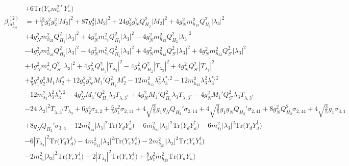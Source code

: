 {\begin{align}
 &+6 \mbox{Tr}\Big({Y_u  m_u^{2 *}  Y_{u}^{\dagger}}\Big) \\ 
\beta_{m_{h_{23}}^2}^{(2)} & =  
+\frac{18}{5} g_{1}^{2} g_{2}^{2} |M_2|^2 +87 g_{2}^{4} |M_2|^2 +24 g_{2}^{2} g_{N}^{2} Q_{H_2}^{2} |M_2|^2 +4 g_{N}^{2} m_{h_{13}}^2 Q_{H_1}^{2} |\lambda_3|^2 \nonumber \\ 
 &+4 g_{N}^{2} m_{h_{23}}^2 Q_{H_1}^{2} |\lambda_3|^2 +4 g_{N}^{2} m_{s_3}^2 Q_{H_1}^{2} |\lambda_3|^2 -4 g_{N}^{2} m_{h_{13}}^2 Q_{H_2}^{2} |\lambda_3|^2 \nonumber \\ 
 &-4 g_{N}^{2} m_{h_{23}}^2 Q_{H_2}^{2} |\lambda_3|^2 -4 g_{N}^{2} m_{s_3}^2 Q_{H_2}^{2} |\lambda_3|^2 +4 g_{N}^{2} m_{h_{13}}^2 Q_{S'}^{2} |\lambda_3|^2 +4 g_{N}^{2} m_{h_{23}}^2 Q_{S'}^{2} |\lambda_3|^2 \nonumber \\ 
 &+4 g_{N}^{2} m_{s_3}^2 Q_{S'}^{2} |\lambda_3|^2 +4 g_{N}^{2} Q_{H_1}^{2} |T_{\lambda_3}|^2 -4 g_{N}^{2} Q_{H_2}^{2} |T_{\lambda_3}|^2 +4 g_{N}^{2} Q_{S'}^{2} |T_{\lambda_3}|^2 \nonumber \\ 
 &+\frac{9}{5} g_{1}^{2} g_{2}^{2} M_1 M_2^* +12 g_{2}^{2} g_{N}^{2} M_1' Q_{H_2}^{2} M_2^* -12 m_{h_{13}}^2 \lambda_{3}^{2} \lambda_{3}^{*,2} -12 m_{h_{23}}^2 \lambda_{3}^{2} \lambda_{3}^{*,2} \nonumber \\ 
 &-12 m_{s_3}^2 \lambda_{3}^{2} \lambda_{3}^{*,2} -4 g_{N}^{2} M_1' Q_{H_1}^{2} \lambda_3 T_{{\lambda,3}^*} +4 g_{N}^{2} M_1' Q_{H_2}^{2} \lambda_3 T_{{\lambda,3}^*} -4 g_{N}^{2} M_1' Q_{S'}^{2} \lambda_3 T_{{\lambda,3}^*} \nonumber \\ 
 &-24 |\lambda_3|^2 T_{{\lambda,3}^*} T_{\lambda_3} +6 g_{2}^{4} \sigma_{2,2} +\frac{6}{5} g_{1}^{2} \sigma_{2,11} +4 \sqrt{\frac{3}{5}} g_1 g_N Q_{H_2}' \sigma_{2,14} +4 \sqrt{\frac{3}{5}} g_1 g_N Q_{H_2}' \sigma_{2,41} +8 g_{N}^{2} Q_{H_2}^{2} \sigma_{2,44} +4 \sqrt{\frac{3}{5}} g_1 \sigma_{3,1} \nonumber \\ 
 &+8 g_N Q_{H_2}' \sigma_{3,4} -12 m_{h_{13}}^2 |\lambda_3|^2 \mbox{Tr}\Big({Y_d  Y_{d}^{\dagger}}\Big) -6 m_{h_{23}}^2 |\lambda_3|^2 \mbox{Tr}\Big({Y_d  Y_{d}^{\dagger}}\Big) -6 m_{s_3}^2 |\lambda_3|^2 \mbox{Tr}\Big({Y_d  Y_{d}^{\dagger}}\Big) \nonumber \\ 
 &-6 |T_{\lambda_3}|^2 \mbox{Tr}\Big({Y_d  Y_{d}^{\dagger}}\Big) -4 m_{h_{13}}^2 |\lambda_3|^2 \mbox{Tr}\Big({Y_e  Y_{e}^{\dagger}}\Big) -2 m_{h_{23}}^2 |\lambda_3|^2 \mbox{Tr}\Big({Y_e  Y_{e}^{\dagger}}\Big) \nonumber \\ 
 &-2 m_{s_3}^2 |\lambda_3|^2 \mbox{Tr}\Big({Y_e  Y_{e}^{\dagger}}\Big) -2 |T_{\lambda_3}|^2 \mbox{Tr}\Big({Y_e  Y_{e}^{\dagger}}\Big) +\frac{8}{5} g_{1}^{2} m_{h_{23}}^2 \mbox{Tr}\Big({Y_u  Y_{u}^{\dagger}}\Big) \nonumber \\ 

\end{align}}
